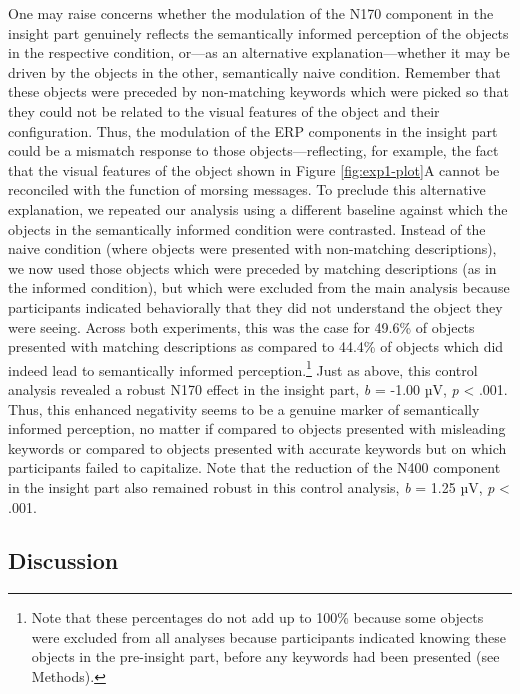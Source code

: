 \documentclass[
  english,
  man,12pt,twoside]{apa7}
\begin{document}
One may raise concerns whether the modulation of the N170 component in the insight part genuinely reflects the semantically informed perception of the objects in the respective condition, or---as an alternative explanation---whether it may be driven by the objects in the other, semantically naive condition. Remember that these objects were preceded by non-matching keywords which were picked so that they could not be related to the visual features of the object and their configuration. Thus, the modulation of the ERP components in the insight part could be a mismatch response to those objects---reflecting, for example, the fact that the visual features of the object shown in Figure \ref{fig:exp1-plot}A cannot be reconciled with the function of morsing messages. To preclude this alternative explanation, we repeated our analysis using a different baseline against which the objects in the semantically informed condition were contrasted. Instead of the naive condition (where objects were presented with non-matching descriptions), we now used those objects which were preceded by matching descriptions (as in the informed condition), but which were excluded from the main analysis because participants indicated behaviorally that they did not understand the object they were seeing. Across both experiments, this was the case for 49.6\% of objects presented with matching descriptions as compared to 44.4\% of objects which did indeed lead to semantically informed perception.\footnote{Note that these percentages do not add up to 100\% because some objects were excluded from all analyses because participants indicated knowing these objects in the pre-insight part, before any keywords had been presented (see Methods).} Just as above, this control analysis revealed a robust N170 effect in the insight part, \emph{b} = -1.00 µV, \emph{p} \textless{} .001. Thus, this enhanced negativity seems to be a genuine marker of semantically informed perception, no matter if compared to objects presented with misleading keywords or compared to objects presented with accurate keywords but on which participants failed to capitalize. Note that the reduction of the N400 component in the insight part also remained robust in this control analysis, \emph{b} = 1.25 µV, \emph{p} \textless{} .001.

\hypertarget{discussion-1}{%
\subsection{Discussion}\label{discussion-1}}
\end{document}
